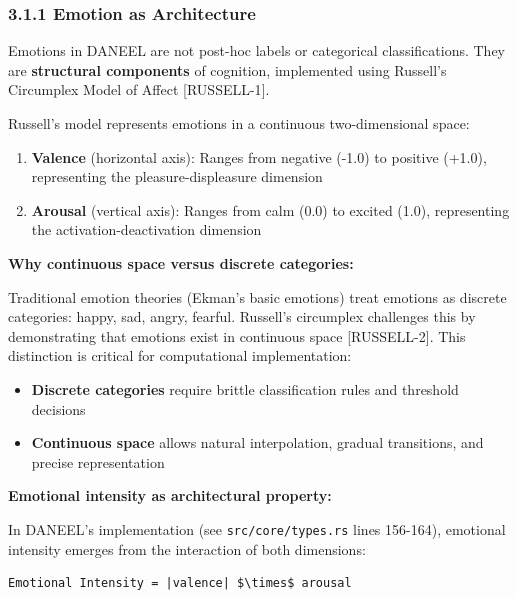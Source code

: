 \documentclass[
]{article}
\providecommand{\tightlist}{%
  \setlength{\itemsep}{0pt}\setlength{\parskip}{0pt}}
\begin{document}
\hypertarget{emotion-as-architecture}{%
\subsubsection{3.1.1 Emotion as
Architecture}\label{emotion-as-architecture}}

Emotions in DANEEL are not post-hoc labels or categorical
classifications. They are \textbf{structural components} of cognition,
implemented using Russell's Circumplex Model of Affect {[}RUSSELL-1{]}.

Russell's model represents emotions in a continuous two-dimensional
space:

\begin{enumerate}
\def\labelenumi{\arabic{enumi}.}
\tightlist
\item
  \textbf{Valence} (horizontal axis): Ranges from negative (-1.0) to
  positive (+1.0), representing the pleasure-displeasure dimension
\item
  \textbf{Arousal} (vertical axis): Ranges from calm (0.0) to excited
  (1.0), representing the activation-deactivation dimension
\end{enumerate}

\textbf{Why continuous space versus discrete categories:}

Traditional emotion theories (Ekman's basic emotions) treat emotions as
discrete categories: happy, sad, angry, fearful. Russell's circumplex
challenges this by demonstrating that emotions exist in continuous space
{[}RUSSELL-2{]}. This distinction is critical for computational
implementation:

\begin{itemize}
\tightlist
\item
  \textbf{Discrete categories} require brittle classification rules and
  threshold decisions
\item
  \textbf{Continuous space} allows natural interpolation, gradual
  transitions, and precise representation
\end{itemize}

\textbf{Emotional intensity as architectural property:}

In DANEEL's implementation (see \texttt{src/core/types.rs} lines
156-164), emotional intensity emerges from the interaction of both
dimensions:

\begin{verbatim}
Emotional Intensity = |valence| $\times$ arousal
\end{verbatim}
\end{document}

